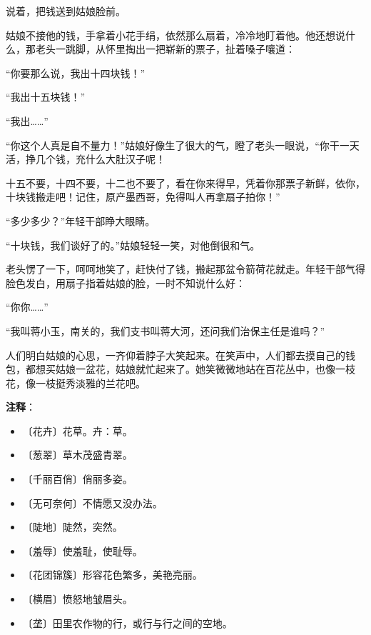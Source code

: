 \documentclass[12pt,UTF-8,openany]{ctexbook}
\begin{document}
\begin{large}
    说着，把钱送到姑娘脸前。
    
    姑娘不接他的钱，手拿着小花手绢，依然那么扇着，冷冷地盯着他。他还想说什么，那老头一跳脚，从怀里掏出一把崭新的票子，扯着嗓子嚷道：
    
    “你要那么说，我出十四块钱！”
    
    “我出十五块钱！”
    
    “我出……”
    
    “你这个人真是自不量力！”姑娘好像生了很大的气，瞪了老头一眼说，“你干一天活，挣几个钱，充什么大肚汉子呢！
    
    十五不要，十四不要，十二也不要了，看在你来得早，凭着你那票子新鲜，依你，十块钱搬走吧！记住，原产墨西哥，免得叫人再拿扇子拍你！”
    
    “多少多少？”年轻干部睁大眼睛。
    
    “十块钱，我们谈好了的。”姑娘轻轻一笑，对他倒很和气。
    
    老头愣了一下，呵呵地笑了，赶快付了钱，搬起那盆令箭荷花就走。年轻干部气得脸色发白，用扇子指着姑娘的脸，一时不知说什么好：
    
    “你你……”
    
    “我叫蒋小玉，南关的，我们支书叫蒋大河，还问我们治保主任是谁吗？”
    
    人们明白姑娘的心思，一齐仰着脖子大笑起来。在笑声中，人们都去摸自己的钱包，都想买姑娘一盆花，姑娘就忙起来了。她笑微微地站在百花丛中，也像一枝花，像一枝挺秀淡雅的兰花吧。
    
\end{large}


\newpage

\textbf{注释}：

\vspace{-1em}

\begin{itemize}
    \setlength\itemsep{-0.2em}
    \item 〔花卉〕花草。卉：草。
    \item 〔葱翠〕草木茂盛青翠。
    \item 〔千丽百俏〕俏丽多姿。
    \item 〔无可奈何〕不情愿又没办法。
    \item 〔陡地〕陡然，突然。
    \item 〔羞辱〕使羞耻，使耻辱。
    \item 〔花团锦簇〕形容花色繁多，美艳亮丽。
    \item 〔横眉〕愤怒地皱眉头。
    \item 〔垄〕田里农作物的行，或行与行之间的空地。
\end{itemize}
\end{document}
